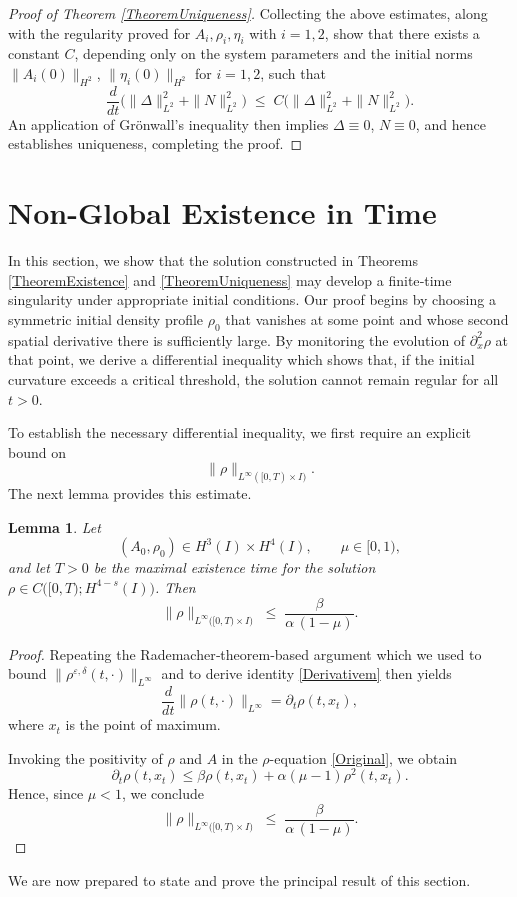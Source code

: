 \documentclass[12pt]{amsart}
\newtheorem{lemma}{Lemma}
\begin{document}
\begin{proof}[Proof of Theorem \ref{TheoremUniqueness}]
	Collecting the above estimates, along with the regularity proved for $A_i,\rho_i,\eta_i$ with $i=1,2$,  show that there exists a constant $C$, depending only on the system parameters and the initial norms $\|A_i(0)\|_{H^2}$, $\|\eta_i(0)\|_{H^2}$ for $i=1,2$, such that
\[
\frac{d}{dt}\bigl(\|\Delta\|_{L^2}^2 + \|N\|_{L^2}^2\bigr)
\;\le\;
C\bigl(\|\Delta\|_{L^2}^2 + \|N\|_{L^2}^2\bigr).
\]
An application of Grönwall’s inequality then implies $\Delta\equiv0$, $N\equiv0$, and hence establishes uniqueness, completing  the proof.
\end{proof}


\section{Non-Global Existence in Time}
\label{sec4}


In this section, we show that the solution constructed in Theorems \ref{TheoremExistence} and \ref{TheoremUniqueness} may develop a finite‐time singularity under appropriate initial conditions. Our proof begins by choosing a symmetric initial density profile $\rho_{0}$ that vanishes at some point and whose second spatial derivative there is sufficiently large. By monitoring the evolution of $\partial_{x}^{2}\rho$ at that point, we derive a differential inequality which shows that, if the initial curvature exceeds a critical threshold, the solution cannot remain regular for all $t>0$.

To establish the necessary differential inequality, we first require an explicit bound on 
\[
\|\rho\|_{L^{\infty}([0,T)\times I)}.
\]
The next lemma provides this estimate.



\begin{lemma}\label{LinftyLinfty}
	Let 
\[
(A_0,\rho_0)\in H^3(I)\times H^4(I),
\qquad 
\mu\in[0,1),
\]
and let $T>0$ be the maximal existence time for the solution 
$\rho\in C\bigl([0,T);H^{4-s}(I)\bigr)$. Then
\[
\|\rho\|_{L^\infty\bigl([0,T)\times I\bigr)}
\;\le\;
\frac{\beta}{\alpha\,(1-\mu)}.
\]
\end{lemma}
\begin{proof}
	Repeating the Rademacher‐theorem‐based argument which we used to bound 
$\|\rho^{\varepsilon,\delta}(t,\cdot)\|_{L^\infty}$ 
and to derive identity \eqref{Derivativem} then yields
\begin{equation*}
	\frac{d} {dt}\|\rho(t,\cdot)\|_{L^\infty}=\partial_t\rho(t,x_t),
\end{equation*}
where $x_t$ is the point of maximum.

Invoking the positivity of $\rho$ and $A$ in the $\rho$-equation \eqref{Original}, we obtain
\begin{equation*}
	\partial_t\rho(t,x_t)\leq \beta\rho(t,x_t)+\alpha(\mu-1)\rho^2(t,x_t).
\end{equation*}
Hence, since $\mu<1$, we conclude
\[
\|\rho\|_{L^\infty\bigl([0,T)\times I\bigr)}
\;\le\;
\frac{\beta}{\alpha\,(1-\mu)}.
\]
\end{proof}
We are now prepared to state and prove the principal result of this section.
\end{document}

